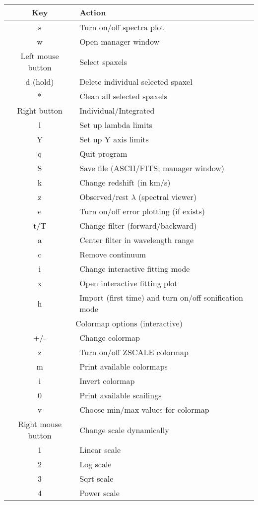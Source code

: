 \documentclass[12pt]{article}
\begin{document}
\centering
\setlength{\tabcolsep}{1cm}
\begin{tabular} {c l}
\hline
\rowcolor{MilkTea!25!white}
Key & Action \\
\hline
s & Turn on/off spectra plot\\
w & Open manager window \\
Left mouse button & Select spaxels \\
d (hold) & Delete individual selected spaxel \\
$*$ & Clean all selected spaxels\\
Right button & Individual/Integrated \\
l & Set up lambda limits\\
Y & Set up Y axis limits\\
q & Quit program\\
S & Save file (ASCII/FITS; manager window) \\
k & Change redshift (in km/s) \\
z & Observed/rest $\lambda$ (spectral viewer) \\
e & Turn on/off error plotting (if exists) \\
t/T &  Change filter (forward/backward) \\
a & Center filter in wavelength range \\
c & Remove continuum \\
i & Change interactive fitting mode \\
x & Open interactive fitting plot \\
h & Import (first time) and turn on/off sonification mode \\
\multicolumn{2}{c}{\cellcolor{MilkTea!25!white} Colormap options (interactive)} \\
+/- & Change colormap \\
z & Turn on/off ZSCALE colormap\\
m & Print available colormaps \\
i & Invert colormap \\
0 & Print available scailings \\
v & Choose min/max values for colormap \\
Right mouse button & Change scale dynamically\\
1 & Linear scale \\
2 & Log scale \\
3 & Sqrt scale \\
4 & Power scale \\

\end{tabular}
\end{document}
